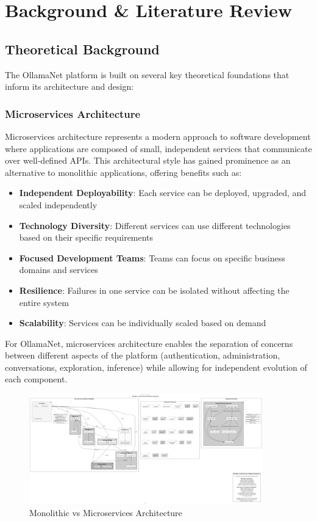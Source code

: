 \def\chapdir{./Chapter02}

\chapter{Background \& Literature Review} \label{ch:background}

\section{Theoretical Background}

The OllamaNet platform is built on several key theoretical foundations that inform its architecture and design:

\subsection{Microservices Architecture}

Microservices architecture represents a modern approach to software development where applications are composed of small, independent services that communicate over well-defined APIs. This architectural style has gained prominence as an alternative to monolithic applications, offering benefits such as:

\begin{itemize}
    \item \textbf{Independent Deployability}: Each service can be deployed, upgraded, and scaled independently
    \item \textbf{Technology Diversity}: Different services can use different technologies based on their specific requirements
    \item \textbf{Focused Development Teams}: Teams can focus on specific business domains and services
    \item \textbf{Resilience}: Failures in one service can be isolated without affecting the entire system
    \item \textbf{Scalability}: Services can be individually scaled based on demand
\end{itemize}

For OllamaNet, microservices architecture enables the separation of concerns between different aspects of the platform (authentication, administration, conversations, exploration, inference) while allowing for independent evolution of each component.

\begin{figure}
    \centering
    \includegraphics[width=0.9\textwidth]{./Chapter02/figures/Monolithic_vs_Microservices.png}
    \caption{Monolithic vs Microservices Architecture}
    \label{fig:mono-vs-micro}
\end{figure}

